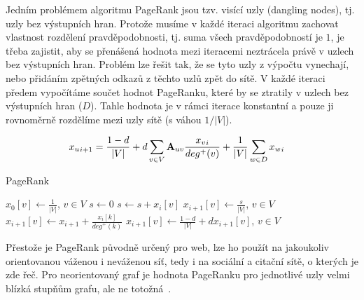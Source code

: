 \documentclass{bakalarka}
\begin{document}
Jedním problémem algoritmu PageRank jsou tzv. visící uzly (dangling nodes), tj.
uzly bez výstupních hran. Protože musíme v každé iteraci algoritmu zachovat
vlastnost rozdělení pravděpodobnosti, tj. suma všech pravděpodobností je $1$,
je třeba zajistit, aby se přenášená hodnota mezi iteracemi neztrácela právě v
uzlech bez výstupních hran. Problém lze řešit tak, že se tyto uzly z výpočtu
vynechají, nebo přidáním zpětných odkazů z těchto uzlů zpět do sítě. V každé
iteraci předem vypočítáme součet hodnot PageRanku, které by se ztratily v
uzlech bez výstupních hran ($D$). Tahle hodnota je v rámci iterace konstantní a
pouze ji rovnoměrně rozdělíme mezi uzly sítě (s váhou $1/|V|$).

\begin{align*}
{x_u}_{i + 1} &= \frac{1 - d}{|V|} + d \displaystyle\sum_{v \in V} {\bf A}_{uv} \frac{{x_v}_i}{deg^+ (v)} + \frac{1}{|V|} \displaystyle\sum_{w \in D} {x_w}_i
\end{align*}


\begin{center}
\begin{minipage}{\textwidth}
\begin{algorithm}[H]
	\caption{PageRank}
		\label{alg:pagerank}

	\begin{algorithmic}[1]
	\Statex
	\State $x_0[v] \gets \frac{1}{|V|}$, $v \in V$
		\State $s \gets 0$
				\State $s \gets s + x_{i}[v]$
			\EndIf
		\EndFor
		\State $x_{i + 1}[v] \gets \frac{s}{|V|}$, $v \in V$
				\State $x_{i + 1}[v] \gets x_{i + 1} + \frac{x_i[k]}{deg^+(k)}$
			\EndFor
		\EndFor
		\State $x_{i + 1}[v] \gets \frac{1 - d}{|V|} + d x_{i + 1}[v]$, $v \in V$
	\EndFor
	\end{algorithmic}
\end{algorithm}
\end{minipage}
\end{center}
\mbox{}

Přestože je PageRank původně určený pro web, lze ho použít na jakoukoliv
orientovanou váženou i neváženou síť, tedy i na sociální a citační sítě, o
kterých je zde řeč. Pro neorientovaný graf je hodnota PageRanku pro jednotlivé
uzly velmi blízká stupňům grafu, ale ne totožná~\citep{perrafortunato2008}.
\end{document}
